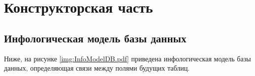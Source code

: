 \chapter{Конструкторская часть}
\label{cha:design}

\section{Инфологическая модель базы данных}
Ниже, на рисунке \ref{img:InfoModelDB.pdf} приведена инфологическая модель базы данных, определяющая связи между полями будущих таблиц.

